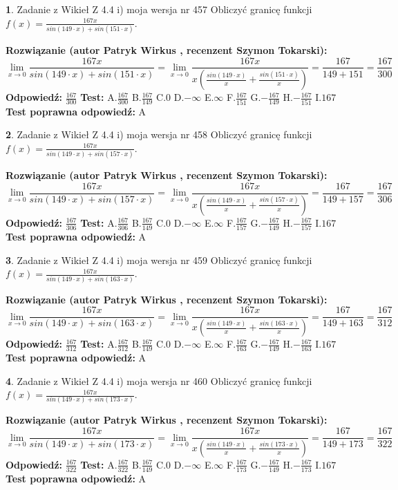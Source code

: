 \documentclass[12pt, a4paper]{article}
\theoremstyle{definition} %
\newtheorem{zad}{}
\newcommand{\zadStart}[1]{\begin{zad}#1\newline}
\newcommand{\zadStop}{\end{zad}}
\newcommand{\rozwStart}[2]{\noindent \textbf{Rozwiązanie (autor #1 , recenzent #2): }\newline}
\newcommand{\rozwStop}{\newline}
\newcommand{\odpStart}{\noindent \textbf{Odpowiedź:}\newline}
\newcommand{\odpStop}{\newline}
\newcommand{\testStart}{\noindent \textbf{Test:}\newline}
\newcommand{\testStop}{\newline}
\newcommand{\kluczStart}{\noindent \textbf{Test poprawna odpowiedź:}\newline}
\newcommand{\kluczStop}{\newline}
\begin{document}
\zadStart{Zadanie z Wikieł Z 4.4 i) moja wersja nr 457}
Obliczyć granicę funkcji $f(x)=\frac{167x}{sin(149\cdot x) +sin(151\cdot x)}$.
\zadStop
\rozwStart{Patryk Wirkus}{Szymon Tokarski}
$$\lim\limits_{x\to 0}\frac{167x}{sin(149\cdot x) +sin(151\cdot x)}=\lim\limits_{x\to 0}\frac{167x}{x(\frac{sin(149\cdot x)}{x}+\frac{sin(151\cdot x)}{x})}=\frac{167}{149+151} = \frac{167}{300}$$
\rozwStop
\odpStart
$\frac{167}{300}$
\odpStop
\testStart
A.$\frac{167}{300}$
B.$\frac{167}{149}$
C.$0$
D.$-\infty$
E.$\infty$
F.$\frac{167}{151}$
G.$-\frac{167}{149}$
H.$-\frac{167}{151}$
I.$167$
\testStop
\kluczStart
A
\kluczStop



\zadStart{Zadanie z Wikieł Z 4.4 i) moja wersja nr 458}
Obliczyć granicę funkcji $f(x)=\frac{167x}{sin(149\cdot x) +sin(157\cdot x)}$.
\zadStop
\rozwStart{Patryk Wirkus}{Szymon Tokarski}
$$\lim\limits_{x\to 0}\frac{167x}{sin(149\cdot x) +sin(157\cdot x)}=\lim\limits_{x\to 0}\frac{167x}{x(\frac{sin(149\cdot x)}{x}+\frac{sin(157\cdot x)}{x})}=\frac{167}{149+157} = \frac{167}{306}$$
\rozwStop
\odpStart
$\frac{167}{306}$
\odpStop
\testStart
A.$\frac{167}{306}$
B.$\frac{167}{149}$
C.$0$
D.$-\infty$
E.$\infty$
F.$\frac{167}{157}$
G.$-\frac{167}{149}$
H.$-\frac{167}{157}$
I.$167$
\testStop
\kluczStart
A
\kluczStop



\zadStart{Zadanie z Wikieł Z 4.4 i) moja wersja nr 459}
Obliczyć granicę funkcji $f(x)=\frac{167x}{sin(149\cdot x) +sin(163\cdot x)}$.
\zadStop
\rozwStart{Patryk Wirkus}{Szymon Tokarski}
$$\lim\limits_{x\to 0}\frac{167x}{sin(149\cdot x) +sin(163\cdot x)}=\lim\limits_{x\to 0}\frac{167x}{x(\frac{sin(149\cdot x)}{x}+\frac{sin(163\cdot x)}{x})}=\frac{167}{149+163} = \frac{167}{312}$$
\rozwStop
\odpStart
$\frac{167}{312}$
\odpStop
\testStart
A.$\frac{167}{312}$
B.$\frac{167}{149}$
C.$0$
D.$-\infty$
E.$\infty$
F.$\frac{167}{163}$
G.$-\frac{167}{149}$
H.$-\frac{167}{163}$
I.$167$
\testStop
\kluczStart
A
\kluczStop



\zadStart{Zadanie z Wikieł Z 4.4 i) moja wersja nr 460}
Obliczyć granicę funkcji $f(x)=\frac{167x}{sin(149\cdot x) +sin(173\cdot x)}$.
\zadStop
\rozwStart{Patryk Wirkus}{Szymon Tokarski}
$$\lim\limits_{x\to 0}\frac{167x}{sin(149\cdot x) +sin(173\cdot x)}=\lim\limits_{x\to 0}\frac{167x}{x(\frac{sin(149\cdot x)}{x}+\frac{sin(173\cdot x)}{x})}=\frac{167}{149+173} = \frac{167}{322}$$
\rozwStop
\odpStart
$\frac{167}{322}$
\odpStop
\testStart
A.$\frac{167}{322}$
B.$\frac{167}{149}$
C.$0$
D.$-\infty$
E.$\infty$
F.$\frac{167}{173}$
G.$-\frac{167}{149}$
H.$-\frac{167}{173}$
I.$167$
\testStop
\kluczStart
A
\kluczStop
\end{document}
